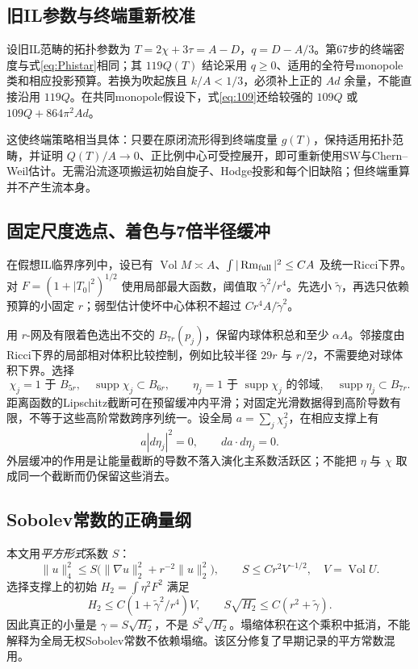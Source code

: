 \documentclass[UTF8,a4paper,11pt,fontset=fandol]{ctexart}
\numberwithin{equation}{section}
\theoremstyle{definition}
\newcommand{\Rm}{\operatorname{Rm}}
\newcommand{\Vol}{\operatorname{Vol}}
\begin{document}
\subsection{旧IL参数与终端重新校准}
设旧IL范畴的拓扑参数为 $T=2\chi+3\tau=A-D$，$q=D-A/3$。第67步的终端密度与式\eqref{eq:Phistar}相同；其 $119Q(T)$ 结论采用 $q\ge0$、适用的全符号monopole类和相应投影预算。若换为吹起族且 $k/A<1/3$，必须补上正的 $Ad$ 余量，不能直接沿用 $119Q$。在共同monopole假设下，式\eqref{eq:109}还给较强的 $109Q$ 或 $109Q+864\pi^2Ad$。

这使终端策略相当具体：只要在原闭流形得到终端度量 $g(T)$，保持适用拓扑范畴，并证明 $Q(T)/A\to0$、正比例中心可受控展开，即可重新使用SW与Chern--Weil估计。无需沿流逐项搬运初始自旋子、Hodge投影和每个旧缺陷；但终端重算并不产生流本身。

\subsection{固定尺度选点、着色与7倍半径缓冲}
在假想IL临界序列中，设已有 $\Vol M\asymp A$、$\int|\Rm_{\rm full}|^2\le C A$ 及统一Ricci下界。对 $F=(1+|T_0|^2)^{1/2}$ 使用局部最大函数，阈值取 $\widetilde\gamma^2/r^4$。先选小 $\widetilde\gamma$，再选只依赖预算的小固定 $r$；弱型估计使坏中心体积不超过 $Cr^4A/\widetilde\gamma^2$。

用 $r$-网及有限着色选出不交的 $B_{7r}(p_j)$，保留内球体积总和至少 $\alpha A$。邻接度由Ricci下界的局部相对体积比较控制，例如比较半径 $29r$ 与 $r/2$，不需要绝对球体积下界。选择
\[
\chi_j=1\text{ 于 }B_{5r},\quad\operatorname{supp}\chi_j\subset B_{6r},
\qquad \eta_j=1\text{ 于 }\operatorname{supp}\chi_j\text{ 的邻域},\quad
\operatorname{supp}\eta_j\subset B_{7r}.
\]
距离函数的Lipschitz截断可在预留缓冲内平滑；对固定光滑数据得到高阶导数有限，不等于这些高阶常数跨序列统一。设全局 $a=\sum_j\chi_j^2$，在相应支撑上有
\[
a|d\eta_j|^2=0,\qquad da\cdot d\eta_j=0.
\]
外层缓冲的作用是让能量截断的导数不落入演化主系数活跃区；不能把 $\eta$ 与 $\chi$ 取成同一个截断而仍保留这些消去。

\subsection{Sobolev常数的正确量纲}
本文用\emph{平方形式}系数 $S$：
\[
\|u\|_4^2\le S\big(\|\nabla u\|_2^2+r^{-2}\|u\|_2^2\big),
\qquad S\le C r^2 V^{-1/2},\quad V=\Vol U.
\]
选择支撑上的初始 $H_2=\int\eta^2F^2$ 满足
\[
H_2\le C(1+\widetilde\gamma^2/r^4)V,\qquad
S\sqrt{H_2}\le C(r^2+\widetilde\gamma).
\]
因此真正的小量是 $\gamma=S\sqrt{H_2}$，不是 $S^2\sqrt{H_2}$。塌缩体积在这个乘积中抵消，不能解释为全局无权Sobolev常数不依赖塌缩。该区分修复了早期记录的平方常数混用。
\end{document}
